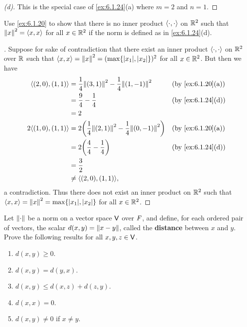 \begin{proof}[(d)]
  This is the special case of \cref{ex:6.1.24}(a) where \(m = 2\) and \(n = 1\).
\end{proof}

\begin{ex}\label{ex:6.1.25}
  Use \cref{ex:6.1.20} to show that there is no inner product \(\left\langle\cdot, \cdot\right\rangle\) on \(\mathbb{R}^2\) such that \(\left\lVert x\right\rVert^2 = \left\langle x, x\right\rangle\) for all \(x \in \mathbb{R}^2\) if the norm is defined as in \cref{ex:6.1.24}(d).
\end{ex}

\begin{proof}[]
  Suppose for sake of contradiction that there exist an inner product \(\left\langle\cdot, \cdot\right\rangle\) on \(\mathbb{R}^2\) over \(\mathbb{R}\) such that \(\inn{x, x} = \norm{x}^2 = (\max\set{\abs{x_1}, \abs{x_2}})^2\) for all \(x \in \mathbb{R}^2\).
  But then we have
  \begin{align*}
    \inn{(2, 0), (1, 1)}   & = \dfrac{1}{4} \norm{(3, 1)}^2 - \dfrac{1}{4} \norm{(1, -1)}^2        &  & \by{ex:6.1.20}[a] \\
                           & = \dfrac{9}{4} - \dfrac{1}{4}                                         &  & \by{ex:6.1.24}[d] \\
                           & = 2                                                                                          \\
    2 \inn{(1, 0), (1, 1)} & = 2 \pa{\dfrac{1}{4} \norm{(2, 1)}^2 - \dfrac{1}{4} \norm{(0, -1)}^2} &  & \by{ex:6.1.20}[a] \\
                           & = 2 \pa{\dfrac{4}{4} - \dfrac{1}{4}}                                  &  & \by{ex:6.1.24}[d] \\
                           & = \dfrac{3}{2}                                                                               \\
                           & \neq \inn{(2, 0), (1, 1)},
  \end{align*}
  a contradiction.
  Thus there does not exist an inner product on \(\mathbb{R}^2\) such that \(\inn{x, x} = \norm{x}^2 = \max\set{\abs{x_1}, \abs{x_2}}\) for all \(x \in \mathbb{R}^2\).
\end{proof}

\begin{ex}\label{ex:6.1.26}
  Let \(\left\lVert\cdot\right\rVert\) be a norm on a vector space \(\mathsf{V}\) over \(\mathit{F}\), and define, for each ordered pair of vectors, the scalar \(d(x, y) = \left\lVert x - y\right\rVert\), called the \textbf{distance} between \(x\) and \(y\).
  Prove the following results for all \(x, y, z \in \mathsf{V}\).
  \begin{enumerate}
    \item \(d(x, y) \geq 0\).
    \item \(d(x, y) = d(y, x)\).
    \item \(d(x, y) \leq d(x, z) + d(z, y)\).
    \item \(d(x, x) = 0\).
    \item \(d(x, y) \neq 0\) if \(x \neq y\).
  \end{enumerate}
\end{ex}

